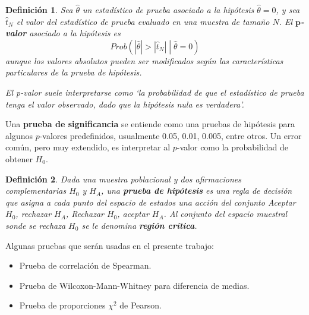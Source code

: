 \documentclass[12pt,letterpaper]{book}
\newtheorem{definicion}{Definición}[chapter]
\newcommand{\abso}[1]{\left| #1 \right|}
\newcommand{\talque}{\mathrel{}\middle|\mathrel{}}
\begin{document}
\begin{definicion}
Sea $\widehat{\theta}$ un estadístico de prueba asociado a la hipótesis $\widehat{\theta}=0$, y sea $\widehat{t}_N$ el valor del estadístico de prueba evaluado en una muestra de tamaño $N$. 
%
El \textbf{$\boldsymbol{p}$-valor} asociado a la hipótesis es 
\begin{equation}
Prob\left( \abso{\widehat{\theta}} > \abso{\widehat{t}_N} \talque \widehat{\theta}= 0 \right)
\end{equation}
aunque los valores absolutos pueden ser modificados según las características particulares de la prueba de hipótesis.

El p-valor suele interpretarse como `la probabilidad de que el estadístico de prueba tenga el valor observado, dado que la hipótesis nula es verdadera'.
\end{definicion}

Una \textbf{prueba de significancia} se entiende como una pruebas de hipótesis para algunos $p$-valores predefinidos, usualmente 0.05, 0.01, 0.005, entre otros.
%
Un error común, pero muy extendido, es interpretar al $p$-valor como la probabilidad de obtener $H_0$.

\begin{definicion}
Dada una muestra poblacional y dos afirmaciones complementarias $H_0$ y $H_A$, una \textbf{prueba de hipótesis} es una regla de decisión que asigna a cada punto del espacio de estados una acción del conjunto Aceptar $H_0$, rechazar $H_A$, Rechazar $H_0$, aceptar $H_A$.
%
Al conjunto del espacio muestral sonde se rechaza $H_0$ se le denomina \textbf{región crítica}. 
\end{definicion}


Algunas pruebas que serán usadas en el presente trabajo:
\begin{itemize}
\item Prueba de correlación de Spearman.
\item Prueba de Wilcoxon-Mann-Whitney para diferencia de medias.
\item Prueba de proporciones $\chi^2$ de Pearson.
\end{itemize}
\end{document}
